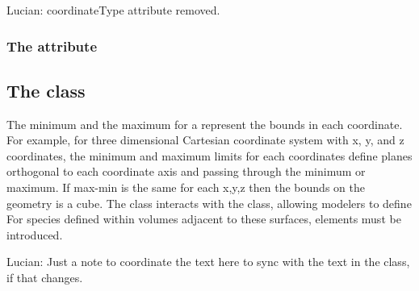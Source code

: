 
{\color{red} Lucian: \notice coordinateType attribute removed.}


\subsubsection{The  attribute}


\subsection{The  class}
\label{Boundary-class}
The minimum and the maximum for a \CoordinateComponent represent the bounds in each coordinate.  For example, for three dimensional Cartesian coordinate system with x, y, and z coordinates, the minimum and maximum limits for each coordinates define planes orthogonal to each coordinate axis and passing through the minimum or maximum.  If max-min is the same for each x,y,z then the bounds on the geometry is a cube.  The \Boundary class interacts with the \BoundaryCondition class, allowing modelers to define   For species defined within volumes adjacent to these surfaces, \BoundaryCondition elements must be introduced.

{\color{red} Lucian: \notice Just a note to coordinate the text here to sync with the text in the \BoundaryCondition class, if that changes.  }

